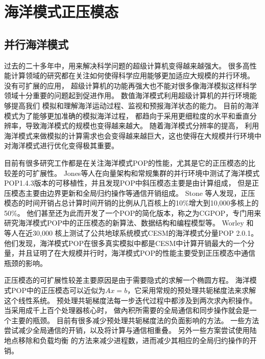 \chapter{海洋模式正压模态}
\label{cha:related}
\section{并行海洋模式}
\label{solver:Backgroud} 

过去的二十多年中，用来解决科学问题的超级计算机变得越来越强大。 
很多高性能计算领域的研究都在关注如何使得科学应用能够更加适应大规模的并行环境。 
没有可扩展的应用， 超级计算机的功能再强大也不能对很多像海洋模拟这样科学领域十分重要的问题起到促进作用。 
数值海洋模式利用超级计算机的并行环境能够提高我们 模拟和理解海洋运动过程、监视和预报海洋状态的能力。 
目前的海洋模式为了能够更加准确的模拟海洋过程， 都趋向于采用更细粒度的水平和垂直分辨率，导致海洋模式的规模也变得越来越大。 
随着海洋模式分辨率的提高， 利用海洋模式来做模拟的计算需求也会变得越来越巨大，这也使得在大规模并行环境中对海洋模式进行优化变得极其重要。 



目前有很多研究工作都是在关注海洋模式POP的性能，尤其是它的正压模态的比较差的可扩展性。 
Jones\cite{pop05}等人在向量架构和常规集群的并行环境中测试了海洋模式POP1.4.3版本的可移植性，并且发现POP中斜压模态主要是由计算组成， 但是正压模态主要由边界更新和全局归约操作等通信开销组成。
Stone  \cite{stone2011cgpop}等人发现，正压模态的时间开销占总计算时间开销的比例从几百核上的10\%增大到10,000多核上的50\%。 
他们甚至还为此而开发了一个POP的简化版本，称之为CGPOP，专门用来研究海洋模式POP中的正压模态的新算法、数据结构和编程模型等。 
Worley  \cite{Worley:2011:PCE:2063384.2063457} 和 \cite{dennis2012computational} 等人在近30,000 核上测试了公共地球系统模式CESM的海洋模式分量POP 2.0.1。 
他们发现，海洋模式POP在很多真实模拟中都是CESM中计算开销最大的一个分量，并且证明了在大规模并行时，海洋模式POP的性能主要受到正压模态中通信瓶颈的影响。 
 

 
正压模态的可扩展性较差主要原因是由于需要隐式的求解一个椭圆方程。 
海洋模式POP中的正压模态可以近似为$Ax=b$，它采用常规的预处理共轭梯度法来求解这个线性系统。 
预处理共轭梯度法每一步迭代过程中都涉及到两次求內积操作。 
当采用成千上百个处理器核心时， 做內积所需要的全局通信和同步操作就会是一个主要的瓶颈。 
目前有很多减少预处理共轭梯度法的负面影响的方法。 
一些方法尝试减少全局通信的开销\cite{dAzevedo1999lapack}，以及将计算与通信相重叠\cite{beare1997optimisation}。 
另外一些方案尝试使用陆地点移除和负载均衡\cite{dennis2007inverse, dennis2008scaling} 的方法来减少进程数，进而减少其相应的全局归约操作的开销。 


